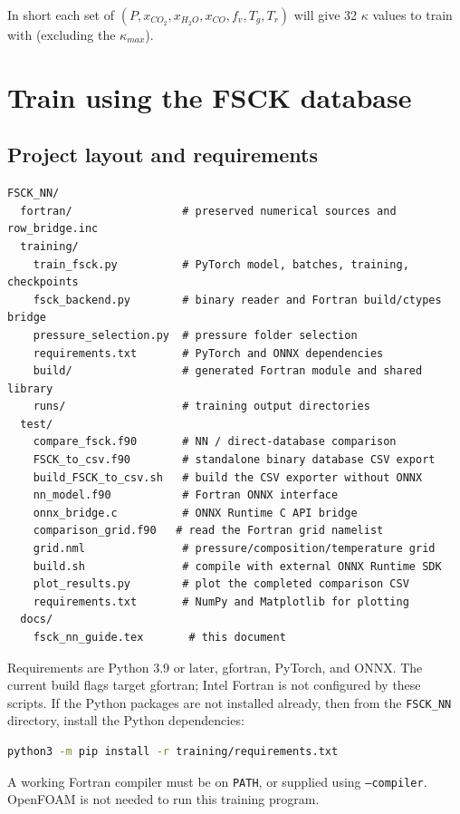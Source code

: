 \documentclass[11pt,letterpaper]{article}
\begin{document}
In short each set of $(P,x_{CO_2},x_{H_2O},x_{CO},f_v,T_g,T_r)$ will give 32 $\kappa$ values to train with (excluding the $\kappa_{max}$).




\section{Train using the FSCK database}
\subsection{Project layout and requirements}
\begin{lstlisting}
FSCK_NN/
  fortran/                 # preserved numerical sources and row_bridge.inc
  training/
    train_fsck.py          # PyTorch model, batches, training, checkpoints
    fsck_backend.py        # binary reader and Fortran build/ctypes bridge
    pressure_selection.py  # pressure folder selection
    requirements.txt       # PyTorch and ONNX dependencies
    build/                 # generated Fortran module and shared library
    runs/                  # training output directories
  test/
    compare_fsck.f90       # NN / direct-database comparison
    FSCK_to_csv.f90        # standalone binary database CSV export
    build_FSCK_to_csv.sh   # build the CSV exporter without ONNX
    nn_model.f90           # Fortran ONNX interface
    onnx_bridge.c          # ONNX Runtime C API bridge
    comparison_grid.f90   # read the Fortran grid namelist
    grid.nml               # pressure/composition/temperature grid
    build.sh               # compile with external ONNX Runtime SDK
    plot_results.py        # plot the completed comparison CSV
    requirements.txt       # NumPy and Matplotlib for plotting
  docs/
    fsck_nn_guide.tex       # this document
\end{lstlisting}
Requirements are Python 3.9 or later, gfortran, PyTorch, and ONNX. The current build flags target gfortran;
Intel Fortran is not configured by these scripts. If the Python packages are not installed already, then
from the \texttt{FSCK\_NN} directory, install the Python dependencies:
\begin{lstlisting}[language=bash]
python3 -m pip install -r training/requirements.txt
\end{lstlisting}
A working Fortran compiler must be on \texttt{PATH}, or supplied using
\texttt{--compiler}. OpenFOAM is not needed to run this training program.
\end{document}
